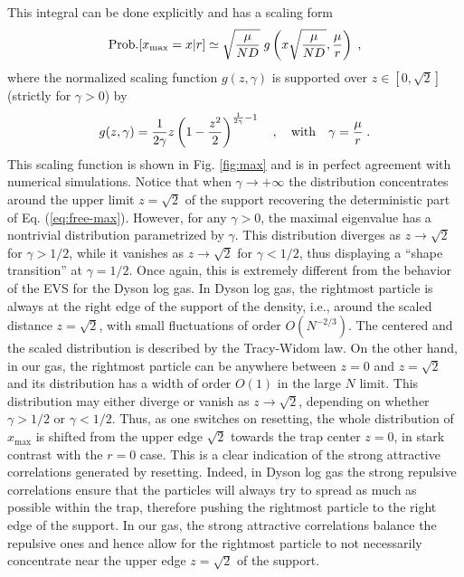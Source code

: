 \documentclass[onecolumn,superscriptaddress,
 amsmath,amssymb,
 aps,
 prd,
]{revtex4-1}
\begin{document}
This integral can be done explicitly and has a scaling form
\begin{equation}\label{eq:max-scaling}
{\rm Prob.}[x_{\rm max} = x | r] \simeq \sqrt{\frac{\mu}{N D}} \; g\left( x \sqrt{\frac{\mu}{N D}}  , \frac{\mu}{r} \right) \;,
\end{equation}
where the normalized scaling function $g(z, \gamma)$ is supported over $z \in [0, \sqrt{2}]$ (strictly for $\gamma > 0$) by
\begin{equation} \label{eq:g-def}
g(z, \gamma) = \frac{1}{2\gamma} z \left(1 - \frac{z^2}{2}\right)^{\frac{1}{2\gamma} - 1} \quad, \quad {\rm with} \quad \gamma = \frac{\mu}{r} \;. 
\end{equation}
This scaling function is shown in Fig. \ref{fig:max} and is in perfect agreement with numerical simulations. Notice that when $\gamma \to +\infty$ the distribution concentrates around the upper limit $z=\sqrt{2}$ of the support recovering the deterministic part of Eq. (\ref{eq:free-max}). However, for any $\gamma >0$, the maximal eigenvalue has a nontrivial distribution parametrized by $\gamma$. This distribution diverges as $z \to \sqrt{2}$ for $\gamma>1/2$, while it vanishes  as $z \to \sqrt{2}$ for $\gamma <1/2$, thus displaying a ``shape transition'' at $\gamma=1/2$. Once again, this is extremely different from the behavior of the EVS for the Dyson log gas. In Dyson log gas, the rightmost particle is always at the right edge of the support of the density, i.e., around the scaled distance $z = \sqrt{2}$, with small fluctuations of order $O(N^{-2/3})$. The centered and the scaled distribution is described by the Tracy-Widom law. On the other hand, in our gas, the 
rightmost particle can be anywhere between $z=0$ and $z= \sqrt{2}$ and its distribution has a width of order $O(1)$ in the large $N$ limit. This distribution may either diverge or vanish as $z \to \sqrt{2}$, depending on whether $\gamma > 1/2$ or $\gamma<1/2$. Thus, as one switches on resetting, the whole distribution of $x_{\max}$ is shifted from the upper edge $\sqrt{2}$ towards the trap center $z=0$, in stark contrast with the $r=0$ case. 
This is a clear indication of the strong attractive correlations generated by resetting. Indeed, in Dyson log gas the strong repulsive correlations ensure that the particles will always try to spread as much as possible within the trap, therefore pushing the rightmost particle to the right edge of the support. In our gas, the strong attractive correlations balance the repulsive ones and hence allow for the rightmost particle to not necessarily concentrate near the upper edge $z=\sqrt{2}$ of the support. 
\end{document}
